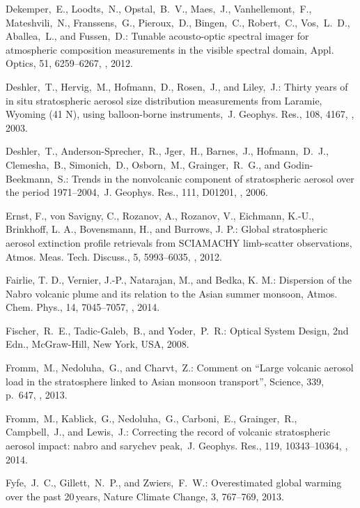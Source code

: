 \documentclass[amt]{copernicus}
\begin{document}
\begin{thebibliography}{99}
Dekemper,~E., Loodts,~N., Opstal,~B.~V., Maes,~J., Vanhellemont,~F.,
Mateshvili,~N., Franssens,~G., Pieroux,~D., Bingen,~C., Robert,~C.,
Vos,~L.~D., Aballea,~L., and Fussen,~D.: Tunable acousto-optic spectral
imager for atmospheric composition measurements in the visible spectral
domain, Appl. Optics, 51, 6259--6267,
,
2012.


Deshler,~T., Hervig,~M., Hofmann,~D., Rosen,~J., and Liley,~J.: Thirty years
of in situ stratospheric aerosol size distribution measurements from Laramie,
Wyoming (41 N), using balloon-borne instruments,~J. Geophys. Res., 108, 4167,
, 2003.


Deshler,~T., Anderson-Sprecher,~R., Jger,~H., Barnes,~J., Hofmann,~D.~J.,
Clemesha,~B., Simonich,~D., Osborn,~M., Grainger,~R.~G., and
Godin-Beekmann,~S.: Trends in the nonvolcanic component of stratospheric
aerosol over the period 1971--2004,~J. Geophys. Res., 111, D01201,
,
2006.


Ernst, F., von Savigny, C., Rozanov, A., Rozanov, V., Eichmann, K.-U.,
Brinkhoff, L. A., Bovensmann, H., and Burrows, J. P.: Global stratospheric
aerosol extinction profile retrievals from SCIAMACHY limb-scatter
observations, Atmos. Meas. Tech. Discuss., 5, 5993--6035,
, 2012.




Fairlie, T. D., Vernier, J.-P., Natarajan, M., and Bedka, K. M.: Dispersion
of the Nabro volcanic plume and its relation to the Asian summer monsoon,
Atmos. Chem. Phys., 14, 7045--7057, , 2014.



Fischer,~R.~E., Tadic-Galeb,~B., and Yoder,~P.~R.: Optical System Design, 2nd
Edn., McGraw-Hill, New York, USA, 2008.


Fromm,~M., Nedoluha,~G., and Charvt,~Z.: Comment on ``Large volcanic aerosol
load in the stratosphere linked to Asian monsoon transport'', Science, 339,
p.~647,
,
2013.


Fromm,~M., Kablick,~G., Nedoluha,~G., Carboni,~E., Grainger,~R.,
Campbell,~J., and Lewis,~J.: Correcting the record of volcanic stratospheric
aerosol impact: nabro and sarychev peak,~J. Geophys. Res., 119, 10343--10364,
,
2014.


Fyfe,~J.~C., Gillett,~N.~P., and Zwiers,~F.~W.: Overestimated global warming
over the past 20\,\unit{years}, Nature Climate Change, 3, 767--769, 2013.



\end{thebibliography}
\end{document}

